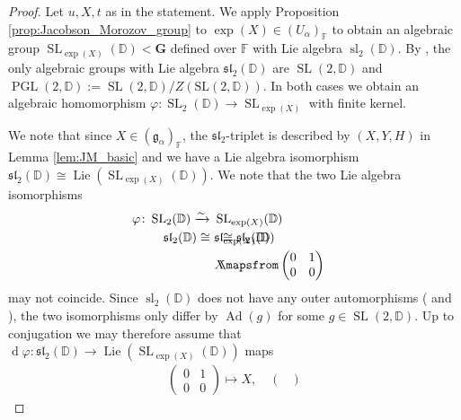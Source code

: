 \documentclass[12pt]{amsart}
\newcommand{\F}{\mathbb{F} }
\newcommand{\D}{\mathbb{D} }
\newcommand{\frakg}{\mathfrak{g}}
\newcommand{\bG}{\mathbf{G}}
\numberwithin{equation}{section}
\theoremstyle{remark} %
\begin{document}
\begin{proof}
	Let $u,X,t$ as in the statement. We apply Proposition \ref{prop:Jacobson_Morozov_group} to $\exp(X) \in (U_\alpha)_\F$ to obtain an algebraic group $\operatorname{SL}_{\exp(X)}(\D) < \bG$ defined over $\F$ with Lie algebra $\operatorname{sl}_2(\D)$. By \cite[Corollary 32.3]{Hum1}, the only algebraic groups with Lie algebra $\mathfrak{sl}_2(\D)$ are $\operatorname{SL}(2,\D)$ and $\operatorname{PGL}(2,\D) := \operatorname{SL}(2,\D)/Z(\operatorname{SL(2,\D)})$. In both cases we obtain an algebraic homomorphism $\varphi \colon \operatorname{SL}_2(\D) \to \operatorname{SL}_{\exp(X)}$ with finite kernel.
	
	We note that since $X\in (\frakg_\alpha)_\F$, the $\mathfrak{sl}_2$-triplet is described by $(X,Y,H)$ in Lemma \ref{lem:JM_basic} and we have a Lie algebra isomorphism $\mathfrak{sl}_2(\D) \cong \operatorname{Lie}(\operatorname{SL}_{\exp(X)}(\D))$. We note that the two Lie algebra isomorphisms
	 \begin{align*}
	 \varphi \colon \operatorname{SL}_2(\mathbb{D}) %
	 	\xrightarrow{\sim} & \  \operatorname{SL}_{\exp(X)}(\mathbb{D}) \\
	 	\mathfrak{sl}_2(\mathbb{D}) \cong & \  \mathfrak{sl}_{\exp(X)}(\mathbb{D}) &&\hspace{-14ex} \cong \mathfrak{sl}_2(\mathbb{D}) \\
	 	& \ X &&\hspace{-14ex} \mapsfrom
	 	\begin{pmatrix}
	 		0 & 1 \\ 0 & 0
	 	\end{pmatrix}         
	 \end{align*}
	 may not coincide. Since $\operatorname{sl}_2(\D)$ does not have any outer automorphisms (\cite[Theorem 14.1]{Hum1} and \cite[Proposition D.40]{FuHa}), the two isomorphisms only differ by $\operatorname{Ad}(g)$ for some $g\in \operatorname{SL}(2,\D)$. Up to conjugation we may therefore assume that $\operatorname{d}\!\varphi \colon \mathfrak{sl}_2(\D) \to \operatorname{Lie}(\operatorname{SL}_{\exp(X)}(\D))$ maps 
	 \begin{align*}
	                  \begin{pmatrix}
	                  	0 & 1 \\ 0 & 0
	                  \end{pmatrix}        \mapsto X ,            \quad
	                  	 	\begin{pmatrix}

\end{pmatrix}
\end{align*}
\end{proof}
\end{document}
